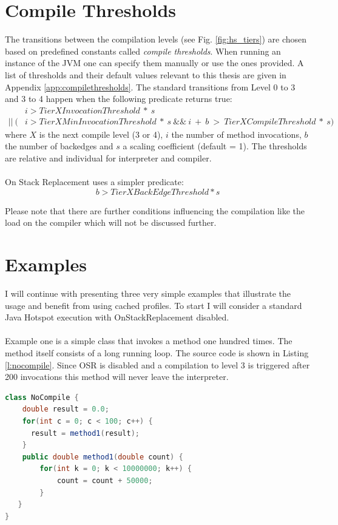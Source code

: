 \section{Compile Thresholds}
\label{sec:compilethresholds}
The transitions between the compilation levels (see Fig. \ref{fig:hs_tiers}) are chosen based on predefined constants called \textit{compile thresholds}. When running an instance of the JVM one can specify them manually or use the ones provided. A list of thresholds and their default values relevant to this thesis are given in Appendix \ref{app:compilethresholds}.
The standard transitions from Level 0 to 3 and 3 to 4 happen when the following predicate returns true:
\begin{align*}
& i > TierXInvocationThreshold \ * \ s \\
 || \ (&i > TierXMinInvocationThreshold \ * \ s \ \&\& \ i \ + \ b \ > \ TierXCompileThreshold \ * \ s) 
\end{align*}
where $X$ is the next compile level (3 or 4), $i$ the number of method invocations, $b$ the number of backedges and $s$ a scaling coefficient (default = 1).
The thresholds are relative and individual for interpreter and compiler.
\\\\
On Stack Replacement uses a simpler predicate:
$$b > TierXBackEdgeThreshold * s$$

Please note that there are further conditions influencing the compilation like the load on the compiler which will not be discussed further.

\section{Examples}

I will continue with presenting three very simple examples that illustrate the usage and benefit from using cached profiles. To start I will consider a standard Java Hotspot execution with OnStackReplacement disabled.
\\\\
Example one is a simple class that invokes a method one hundred times. The method itself consists of a long running loop. The source code is shown in Listing \ref{l:nocompile}.
Since OSR is disabled and a compilation to level 3 is triggered after 200 invocations this method will never leave the interpreter. 
\lstset{numbers=left, numberstyle=\tiny, stepnumber=1, numbersep=5pt}
\lstset{basicstyle=\ttfamily}
\lstset{frame=tb}
\begin{lstlisting}[float,caption=Example usage of the listing package,label=l:nocompile,language=Java]
class NoCompile {
    double result = 0.0;
    for(int c = 0; c < 100; c++) {
      result = method1(result);
    }
    public double method1(double count) {
        for(int k = 0; k < 10000000; k++) {
            count = count + 50000;
        }
   }
}
\end{lstlisting}
